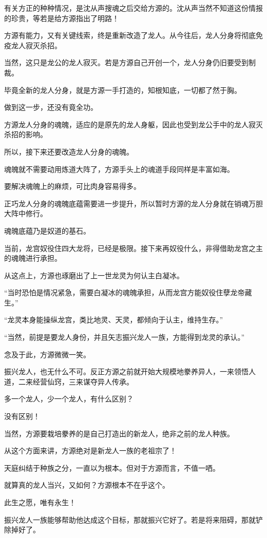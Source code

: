 \begin{this_body}
有关方正的种种情况，是沈从声搜魂之后交给方源的。沈从声当然不知道这份情报的珍贵，等若是给方源指出了明路！

方源有能力，又有关键线索，终是重新改造了龙人。从今往后，龙人分身将彻底免疫龙人寂灭杀招。

当然，这只是龙公的龙人寂灭。若是方源自己开创一个，龙人分身仍旧要受到制裁。

毕竟全新的龙人分身，就是方源一手打造的，知根知底，一切都了然于胸。

做到这一步，还没有竟全功。

方源龙人分身的魂魄，适应的是原先的龙人身躯，因此也受到龙公手中的龙人寂灭杀招的影响。

所以，接下来还要改造龙人分身的魂魄。

魂魄就不需要动用炼道大阵了，方源手头上的魂道手段同样是丰富如海。

要解决魂魄上的麻烦，可比肉身容易得多。

正巧龙人分身的魂魄底蕴需要进一步提升，所以暂时方源的龙人分身就在销魂万胆大阵中修行。

魂魄底蕴乃是奴道的基石。

当前，龙宫奴役住四大龙将，已经是极限。接下来再奴役什么，非得借助龙宫之主的魂魄进行承担。

从这点上，方源也琢磨出了上一世龙灵为何认主白凝冰。

“当时恐怕是情况紧急，需要白凝冰的魂魄承担，从而龙宫方能奴役住孽龙帝藏生。”

“龙灵本身能操纵龙宫，类比地灵、天灵，都倾向于认主，维持生存。”

“当然，前提是要龙人身份，并且矢志振兴龙人一族，方能得到龙灵的承认。”

念及于此，方源微微一笑。

振兴龙人，也无什么不可。反正方源之前就开始大规模地豢养异人，一来领悟人道，二来经营仙窍，三来谋夺异人传承。

多一个龙人，少一个龙人，有什么区别？

没有区别！

当然，方源要栽培豢养的是自己打造出的新龙人，绝非之前的龙人种族。

从这个方面来讲，方源绝对是新龙人一族的老祖宗了！

天庭纠结于种族之分，一直以为根本。但对于方源而言，不值一哂。

就算真的龙人当兴，又如何？方源根本不在乎这个。

此生之愿，唯有永生！

振兴龙人一族能够帮助他达成这个目标，那就振兴它好了。若是将来阻碍，那就铲除掉好了。


\end{this_body}
